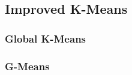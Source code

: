 \subsection{Improved K-Means}
\label{subsec:improvedkmeansresults}


\subsubsection*{Global K-Means}
\label{subsec:globalkmeansresults}


\subsubsection*{G-Means}
\label{subsec:gmeansresults}


